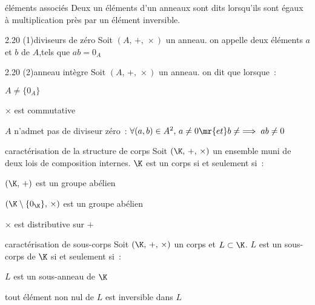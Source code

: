 

\begin{adjustwidth}{-3cm}{-3cm}


\begin{definition}{2.8}{éléments associés}
    Deux un éléments d'un anneaux sont dits  lorsqu'ils sont égaux à multiplication près par un élément inversible.
\end{definition}

\begin{definition}{2.20 (1)}{diviseurs de zéro}
    Soit $(A,\, +,\, \times)$ un anneau. on appelle  deux éléments $a$ et $b$ de $A$,tels que $ab = 0_A$
\end{definition}

\begin{definition}{2.20 (2)}{anneau intègre}
    Soit $(A,\, +,\, \times)$ un anneau. on dit que  lorsque~:
    \begin{enumeratebf}
        \item $A \neq \{0_A\}$
        \item $\times$ est commutative
        \item $A$ n'admet pas de diviseur zéro~: $\forall (a,b) \in A^2,\, a \neq 0 \mr{ et } b\neq \implies ab \neq 0$
    \end{enumeratebf}
\end{definition}

\begin{theoreme}{2.23}{caractérisation de la structure de corps}
    Soit $(\K,\, +,\, \times)$ un ensemble muni de deux lois de composition internes. $\K$ est un corps si et seulement si~:
    \begin{enumeratebf}
        \item $(\K,\, +)$ est un groupe abélien
        \item $(\K \setminus \{0_\K\},\, \times)$ est un groupe abélien
        \item $\times$ est distributive sur $+$
    \end{enumeratebf}
\end{theoreme}

\begin{theoreme}{2.26}{caractérisation de sous-corps}
     Soit $(\K,\, +,\, \times)$ un corps et $L \subset \K$. $L$ est un sous-corps de $\K$ si et seulement si~:
     \begin{enumeratebf}
        \item $L$ est un sous-anneau de $\K$
        \item tout élément non nul de $L$ est inversible dans $L$
     \end{enumeratebf}
\end{theoreme}


\end{adjustwidth}
